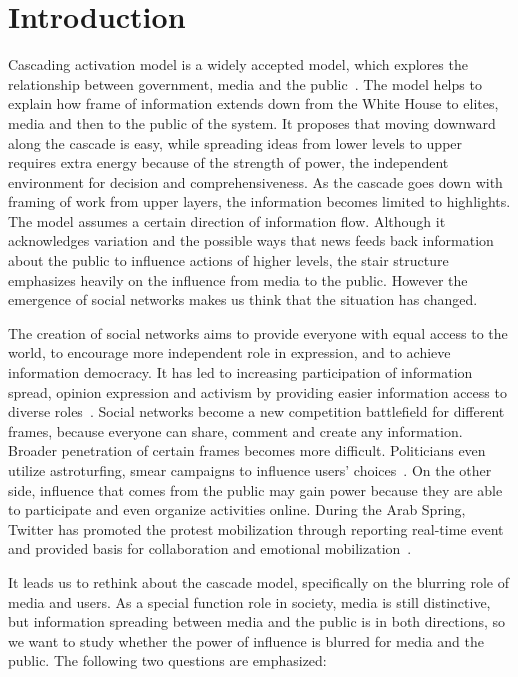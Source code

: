 \section{Introduction}
\label{sec:intro}

Cascading activation model is a widely accepted model, which explores the relationship between government, media and the public~\cite{entman1993framing}. The model helps to explain how frame of information extends down from the White House to elites, media and then to the public of the system. It proposes that moving downward along the cascade is easy, while spreading ideas from lower levels to upper requires extra energy because of the strength of power, the independent environment for decision and comprehensiveness. As the cascade goes down with framing of work from upper layers, the information becomes limited to highlights. The model assumes a certain direction of information flow. Although it acknowledges variation and the possible ways that news feeds back information about the public to influence actions of higher levels, the stair structure emphasizes heavily on the influence from media to the public. However the emergence of social networks makes us think that the situation has changed. 

The creation of social networks aims to provide everyone with equal access to the world, to encourage more independent role in expression, and to achieve information democracy. It has led to increasing participation of information spread, opinion expression and activism by providing easier information access to diverse roles~\cite{kelly2006protest,gonzalez2011dynamics,tufekci2012social}. Social networks become a new competition battlefield for different frames, because everyone can share, comment and create any information. Broader penetration of certain frames becomes more difficult. Politicians even utilize astroturfing, smear campaigns to influence users' choices~\cite{ratkiewicz2010detecting}. On the other side, influence that comes from the public may gain power because they are able to participate and even organize activities online. During the Arab Spring, Twitter has promoted the protest mobilization through reporting real-time event and provided basis for collaboration and emotional mobilization~\cite{breuer2014social}.

It leads us to rethink about the cascade model, specifically on the blurring role of media and users. As a special function role in society, media is still distinctive, but information spreading between media and the public is in both directions, so we want to study whether the power of influence is blurred for media and the public. The following two questions are emphasized:

